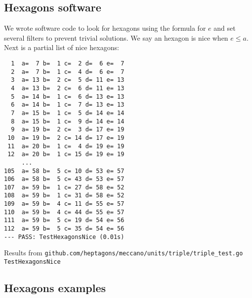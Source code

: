 \documentclass[11pt]{article}
\begin{document}

\subsection{Hexagons software}
We wrote software code to look for hexagons using the formula for $e$ and set several
filters to prevent trivial solutions. We say an hexagon is nice when $e \leq a$.
Next is a partial list of nice hexagons:
\begin{lstlisting}
  1  a=  7 b=  1 c=  2 d=  6 e=  7
  2  a=  7 b=  1 c=  4 d=  6 e=  7
  3  a= 13 b=  2 c=  5 d= 11 e= 13
  4  a= 13 b=  2 c=  6 d= 11 e= 13
  5  a= 14 b=  1 c=  6 d= 13 e= 13
  6  a= 14 b=  1 c=  7 d= 13 e= 13
  7  a= 15 b=  1 c=  5 d= 14 e= 14
  8  a= 15 b=  1 c=  9 d= 14 e= 14
  9  a= 19 b=  2 c=  3 d= 17 e= 19
 10  a= 19 b=  2 c= 14 d= 17 e= 19
 11  a= 20 b=  1 c=  4 d= 19 e= 19
 12  a= 20 b=  1 c= 15 d= 19 e= 19
     ...
105  a= 58 b=  5 c= 10 d= 53 e= 57
106  a= 58 b=  5 c= 43 d= 53 e= 57
107  a= 59 b=  1 c= 27 d= 58 e= 52
108  a= 59 b=  1 c= 31 d= 58 e= 52
109  a= 59 b=  4 c= 11 d= 55 e= 57
110  a= 59 b=  4 c= 44 d= 55 e= 57
111  a= 59 b=  5 c= 19 d= 54 e= 56
112  a= 59 b=  5 c= 35 d= 54 e= 56
--- PASS: TestHexagonsNice (0.01s)
\end{lstlisting}
Results from \texttt{github.com/heptagons/meccano/units/triple/triple\_test.go TestHexagonsNice}

\subsection{Hexagons examples}
\end{document}
